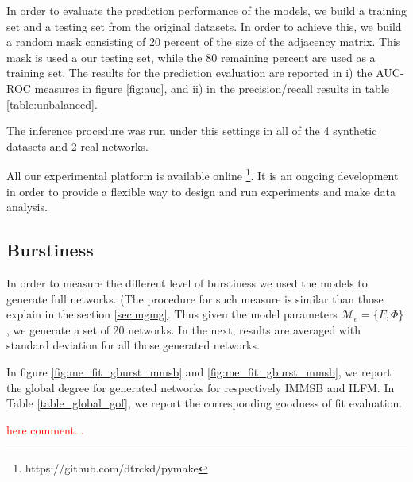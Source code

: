 \documentclass[a4paper, 12pt]{article}
\begin{document}
In order to evaluate the  prediction performance of the models, we build a training set and a testing set from the original datasets. In order to achieve this, we build a random mask consisting of 20 percent of the size of the adjacency matrix. This mask is used a our testing set, while the 80 remaining percent are used as a training set. The results for the prediction evaluation are reported in i) the AUC-ROC measures in figure \ref{fig:auc}, and ii) in the precision/recall results in table \ref{table:unbalanced}.

The inference procedure was run under this settings in all of the 4 synthetic datasets and 2 real networks.

All our experimental platform is available online \footnote{https://github.com/dtrckd/pymake}. It is an ongoing development in order to provide a flexible way to design and run experiments and make data analysis.






\subsection{Burstiness}

In order to measure the different level of burstiness we used the models to generate full networks. (The procedure for such measure is similar than those explain in the section \ref{sec:mgmg}. Thus given the model parameters $\mathcal{M}_e = \{F ,\Phi\}$, we generate a set of 20 networks. In the next, results are averaged  with standard deviation for all those generated networks.

In figure \ref{fig:me_fit_gburst_mmsb} and \ref{fig:me_fit_gburst_mmsb}, we report the global degree for generated networks for respectively IMMSB and ILFM. In Table \ref{table_global_gof}, we report the corresponding goodness of fit evaluation.

\textcolor{red}{here comment...} 



\end{document}

